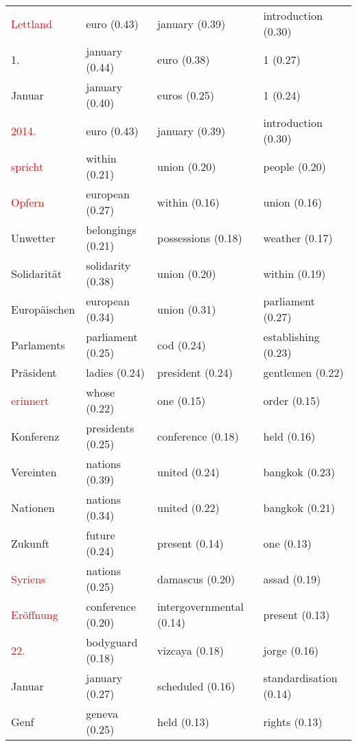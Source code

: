 \documentclass[11pt,twoside,openright]{mpreport}
\begin{document}
\begin{table}[H]
\begin{scriptsize}
\begin{tabular}{|llll|}
\textcolor{red}{Lettland}                & euro (0.43) & january (0.39) & introduction (0.30) \\
1.                      & january (0.44) & euro (0.38) & 1 (0.27) \\ %
Januar                  & january (0.40) & euros (0.25) & 1 (0.24) \\ %
\textcolor{red}{2014.}                   & euro (0.43) & january (0.39) & introduction (0.30) \\
\textcolor{red}{spricht}                 & within (0.21) & union (0.20) & people (0.20) \\
\textcolor{red}{Opfern}                  & european (0.27) & within (0.16) & union (0.16) \\
Unwetter                & belongings (0.21) & possessions (0.18) & weather (0.17) \\ %
Solidarität            & solidarity (0.38) & union (0.20) & within (0.19) \\ %
Europäischen           & european (0.34) & union (0.31) & parliament (0.27) \\ %
Parlaments              & parliament (0.25) & cod (0.24) & establishing (0.23) \\ %
Präsident              & ladies (0.24) & president (0.24) & gentlemen (0.22) \\ %
\textcolor{red}{erinnert}                & whose (0.22) & one (0.15) & order (0.15) \\
Konferenz               & presidents (0.25) & conference (0.18) & held (0.16) \\ %
Vereinten               & nations (0.39) & united (0.24) & bangkok (0.23) \\ %
Nationen                & nations (0.34) & united (0.22) & bangkok (0.21) \\ %
Zukunft                 & future (0.24) & present (0.14) & one (0.13) \\ %
\textcolor{red}{Syriens}                 & nations (0.25) & damascus (0.20) & assad (0.19) \\
\textcolor{red}{Eröffnung}              & conference (0.20) & intergovernmental (0.14) & present (0.13) \\
\textcolor{red}{22.}                     & bodyguard (0.18) & vizcaya (0.18) & jorge (0.16) \\
Januar                  & january (0.27) & scheduled (0.16) & standardisation (0.14) \\ %
Genf                    & geneva (0.25) & held (0.13) & rights (0.13) \\ %

\end{tabular}
\end{scriptsize}
\end{table}
\end{document}

